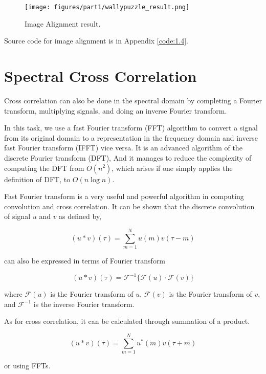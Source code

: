 \begin{figure}[h!]
	\centering
		\texttt{[image: figures/part1/wallypuzzle\_result.png]}
		\caption{Image Alignment result. }
		\label{fig:maze-b}
\end{figure} 

Source code for image alignment is in Appendix \ref{code:1.4}.

\section{Spectral Cross Correlation}

Cross correlation can also be done in the spectral domain by completing a Fourier transform, multiplying signals, and doing an inverse Fourier transform.

In this task, we use a fast Fourier transform (FFT) algorithm to convert a signal from its original domain to a representation in the frequency domain and inverse fast Fourier transform (IFFT) vice versa. It is an advanced algorithm of the discrete Fourier transform (DFT), And it manages to reduce the complexity of computing the DFT from $O(n^2)$, which arises if one simply applies the definition of DFT, to $O(n\log n)$.

Fast Fourier transform is a very useful and powerful algorithm in computing convolution and cross correlation. It can be shown that the discrete convolution of signal $u$ and $v$ as defined by,

\begin{equation*}
(u*v)(\tau)=\sum_{m=1}^{N}u(m)v(\tau-m)
\end{equation*}

can also be expressed in terms of Fourier transform

\begin{equation*}
(u*v)(\tau)=\mathcal{F}^{-1}\{\mathcal{F}(u)\cdot \mathcal{F}(v)\}
\end{equation*}

where $\mathcal{F}(u)$ is the Fourier transform of $u$, $\mathcal{F}(v)$ is the Fourier transform of $v$, and $\mathcal{F}^{-1}$ is the inverse Fourier transform.

As for cross correlation, it can be calculated through summation of a product.

\begin{equation*}
(u*v)(\tau)=\sum_{m=1}^{N}u^*(m)v(\tau+m)
\end{equation*}

or using FFTs.

